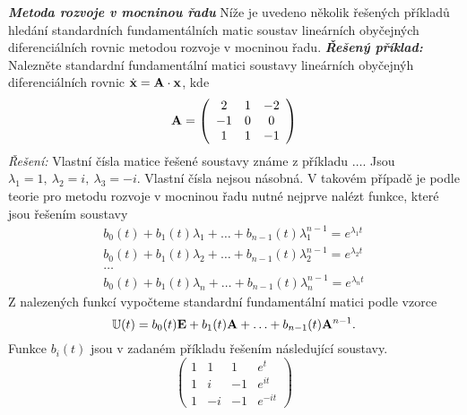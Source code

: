 {\it\bf Metoda rozvoje v mocninou řadu}\newline
Níže je uvedeno několik řešených příkladů hledání standardních fundamentálních matic soustav lineárních obyčejných diferenciálních rovnic metodou rozvoje v mocninou řadu.\newline
{\it\bf Řešený příklad:}\newline %
Nalezněte standardní fundamentální matici soustavy lineárních obyčejnýh diferenciálních rovnic $\dot{\bf x}={\bf A}\cdot {\bf x}$, kde
\begin{equation*}
 {\bf A} = \left(\begin{array}{ccc}
                  2 & 1 & -2\\ -1 & 0 & 0\\ 1 & 1 & -1
                 \end{array}\right)
\end{equation*}
{\it Řešení:}\newline
Vlastní čísla matice řešené soustavy známe z příkladu $\ldots$. Jsou $\lambda_1 = 1,~\lambda_2 = i,~\lambda_3 = -i$.\newline
Vlastní čísla nejsou násobná. V takovém případě je podle teorie pro metodu rozvoje v mocninou řadu nutné nejprve nalézt funkce, které jsou řešením soustavy 
\begin{equation*}
    \begin{array}{c}
      b_0(t) + b_1(t)\lambda_1 + \ldots + b_{n-1}(t) \lambda_1^{n-1} = e^{\lambda_1 t}\\
      b_0(t) + b_1(t)\lambda_2 + \ldots + b_{n-1}(t) \lambda_2^{n-1} = e^{\lambda_2 t}\\
      \ldots\\        
      b_0(t) + b_1(t)\lambda_n + \ldots + b_{n-1}(t) \lambda_n^{n-1} = e^{\lambda_n t}
    \end{array}
\end{equation*}
Z nalezených funkcí vypočteme standardní fundamentální matici podle vzorce
\begin{equation*}
 {\mathbb{U}}(t) = b_0(t){\bf E} + b_1(t){\bf A} + \ldots +b_{n-1}(t){\bf A}^{n-1}.
\end{equation*}
Funkce $b_i(t)$ jsou v zadaném příkladu řešením následující soustavy.
\begin{equation*}
 \left(
   \begin{array}{ccc|c}
    1 & 1 & 1 & e^t\\
    1 & i & -1 & e^{it}\\
    1 & -i & -1 & e^{-it}
   \end{array}
 \right)
\end{equation*}
